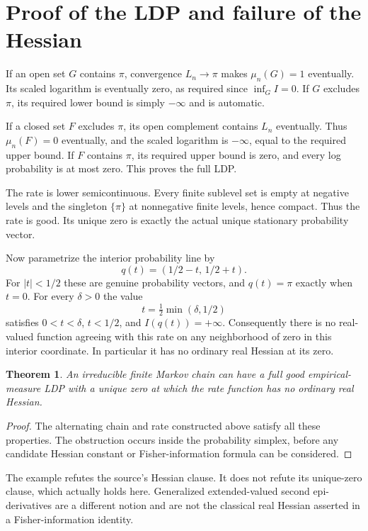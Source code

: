 \documentclass[11pt]{article}
\newtheorem{theorem}{Theorem}
\begin{document}
\newpage
\section*{Proof of the LDP and failure of the Hessian}
If an open set $G$ contains $\pi$, convergence $L_n\to\pi$
makes $\mu_n(G)=1$ eventually. Its scaled logarithm is
eventually zero, as required since $\inf_G I=0$.
If $G$ excludes $\pi$, its required lower bound is simply
$-\infty$ and is automatic.

If a closed set $F$ excludes $\pi$, its open complement
contains $L_n$ eventually. Thus $\mu_n(F)=0$ eventually,
and the scaled logarithm is $-\infty$, equal to the
required upper bound. If $F$ contains $\pi$, its required
upper bound is zero, and every log probability is at
most zero. This proves the full LDP.

The rate is lower semicontinuous. Every finite sublevel
set is empty at negative levels and the singleton
$\{\pi\}$ at nonnegative finite levels, hence compact.
Thus the rate is good. Its unique zero is exactly the
actual unique stationary probability vector.

Now parametrize the interior probability line by
\[
                   q(t)=(1/2-t,\,1/2+t).
\]
For $|t|<1/2$ these are genuine probability vectors,
and $q(t)=\pi$ exactly when $t=0$. For every $\delta>0$
the value
\[
                 t=\tfrac12\min(\delta,1/2)
\]
satisfies $0<t<\delta$, $t<1/2$, and $I(q(t))=+\infty$.
Consequently there is no real-valued function agreeing
with this rate on any neighborhood of zero in this
interior coordinate. In particular it has no ordinary
real Hessian at its zero.

\begin{theorem}
An irreducible finite Markov chain can have a full good
empirical-measure LDP with a unique zero at which the
rate function has no ordinary real Hessian.
\end{theorem}
\begin{proof}
The alternating chain and rate constructed above satisfy
all these properties. The obstruction occurs inside the
probability simplex, before any candidate Hessian constant
or Fisher-information formula can be considered.
\end{proof}

The example refutes the source's Hessian clause. It does
not refute its unique-zero clause, which actually holds
here. Generalized extended-valued second epi-derivatives
are a different notion and are not the classical real
Hessian asserted in a Fisher-information identity.
\end{document}
